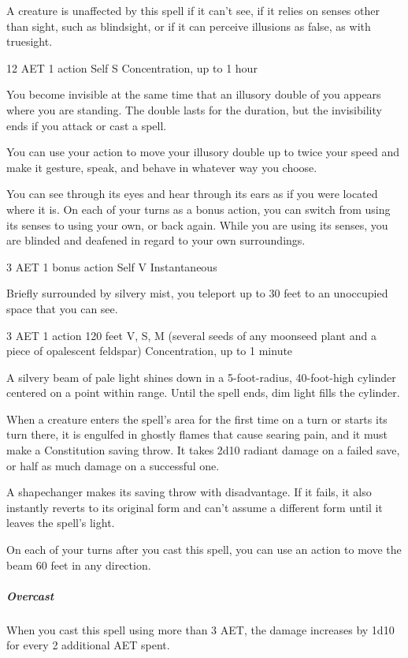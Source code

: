 A creature is unaffected by this spell if it can't see, if it relies on senses other than sight, such as blindsight, or if it can perceive illusions as false, as with truesight.

\label{spell:mislead}
{12 AET}
{1 action}
{Self}
{S}
{Concentration, up to 1 hour}

You become invisible at the same time that an illusory double of you appears where you are standing. The double lasts for the duration, but the invisibility ends if you attack or cast a spell.

You can use your action to move your illusory double up to twice your speed and make it gesture, speak, and behave in whatever way you choose.

You can see through its eyes and hear through its ears as if you were located where it is. On each of your turns as a bonus action, you can switch from using its senses to using your own, or back again. While you are using its senses, you are blinded and deafened in regard to your own surroundings.

\label{spell:misty-step}
{3 AET}
{1 bonus action}
{Self}
{V}
{Instantaneous}

Briefly surrounded by silvery mist, you teleport up to 30 feet to an unoccupied space that you can see.

\label{spell:moonbeam}
{3 AET}
{1 action}
{120 feet}
{V, S, M (several seeds of any moonseed plant and a piece of opalescent feldspar)}
{Concentration, up to 1 minute}

A silvery beam of pale light shines down in a 5-foot-radius, 40-foot-high cylinder centered on a point within range. Until the spell ends, dim light fills the cylinder.

When a creature enters the spell's area for the first time on a turn or starts its turn there, it is engulfed in ghostly flames that cause searing pain, and it must make a Constitution saving throw. It takes 2d10 radiant damage on a failed save, or half as much damage on a successful one.

A shapechanger makes its saving throw with disadvantage. If it fails, it also instantly reverts to its original form and can't assume a different form until it leaves the spell's light.

On each of your turns after you cast this spell, you can use an action to move the beam 60 feet in any direction.
\subparagraph*{Overcast} When you cast this spell using more than 3 AET, the damage increases by 1d10 for every 2 additional AET spent.

